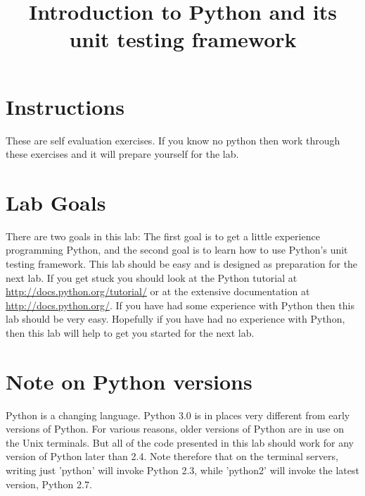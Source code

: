 \documentclass{paper}
\title{Introduction to Python and its unit testing framework}
\begin{document}
\maketitle
\section*{Instructions}
These are self evaluation exercises. If you know no python then work through
these exercises and it will prepare yourself for the lab.
\section*{Lab Goals}
There are two goals in this lab: The first goal is to get a little experience
programming Python, and the second goal is to learn how to use Python's unit
testing framework. This lab should be easy and is designed as preparation for
the next lab. If you get stuck you should look at the Python tutorial at
\url{http://docs.python.org/tutorial/} or at the extensive documentation at
\url{http://docs.python.org/}. If you have had some experience with Python
then this lab should be very easy. Hopefully if you have had no experience
with Python, then this lab will help to get you started for the next lab.
\section*{Note on Python versions}
Python is a changing language. Python 3.0 is in places very different
from early versions of Python. For various reasons, older versions of
Python are in use on the Unix terminals. But all of the code presented in
this lab should work for any version of Python later than 2.4.
Note therefore that on the terminal servers, writing just 'python' will invoke Python 2.3,
while 'python2' will invoke the latest version, Python 2.7.
\end{document}
